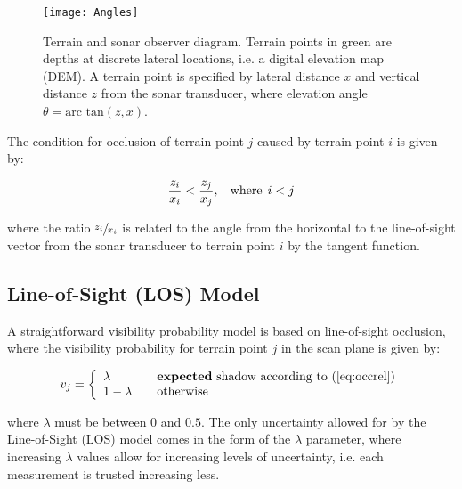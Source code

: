 \begin{figure}[!h]
	\centering
		\texttt{[image: Angles]}
	\caption{Terrain and sonar observer diagram.  Terrain points in green are depths at discrete lateral locations, i.e. a digital elevation map (DEM).  A terrain point is specified by lateral distance $x$ and vertical distance $z$ from the sonar transducer, where elevation angle $\theta = \text{arc tan}(z,x)$. }
	\label{fig:angles}
\end{figure}

The condition for occlusion of terrain point $j$ caused by terrain point $i$ is given by:

\begin{equation}
\frac{z_i}{x_i} < \frac{z_j}{x_j},  \hspace{2ex} \text{where} \hspace{1ex} i < j
\label{eq:occrel}
\end{equation}

\noindent where the ratio $\sfrac{z_i}{x_i}$ is related to the angle from the horizontal to the line-of-sight vector from the sonar transducer to terrain point $i$ by the tangent function.  

\subsection{Line-of-Sight (LOS) Model}
\label{visibility.Visibility.LOS}

A straightforward visibility probability model is based on line-of-sight occlusion, where the visibility probability for terrain point $j$ in the scan plane is given by:

\begin{equation}
v_j = \left\{ 
  \begin{array}{l l}
    \lambda & \quad \text{\textbf{expected} shadow according to (\ref{eq:occrel})}\\
    1 - \lambda & \quad \text{otherwise}
  \end{array} \right.
  \label{eq:detSignal}
\end{equation}

\noindent where $\lambda$ must be between $0$ and $0.5$.  The only uncertainty allowed for by the Line-of-Sight (LOS) model comes in the form of the $\lambda$ parameter, where increasing $\lambda$ values allow for increasing levels of uncertainty, i.e. each measurement is trusted increasing less.

